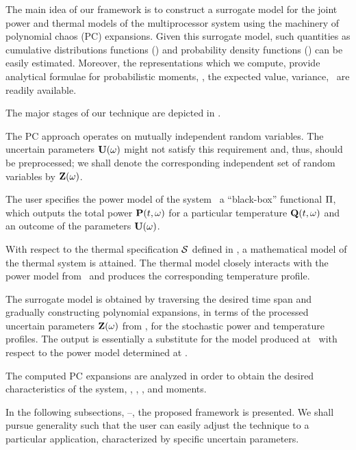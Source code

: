 The main idea of our framework is to construct a surrogate model for the joint power and thermal models of the multiprocessor system using the machinery of polynomial chaos (PC) expansions.
Given this surrogate model, such quantities as cumulative distributions functions (\cdfs) and probability density functions (\pdfs) can be easily estimated. Moreover, the representations which we compute, provide analytical formulae for probabilistic moments, \ie, the expected value, variance, \etc\ are readily available.

The major stages of our technique are depicted in .

The PC approach operates on mutually independent random variables. The uncertain parameters $\mathbf{U}(\omega)$ might not satisfy this requirement and, thus, should be preprocessed; we shall denote the corresponding independent set of random variables by $\mathbf{Z}(\omega)$.

The user specifies the power model of the system \via\ a ``black-box'' functional $\oPower$, which outputs the total power $\mathbf{P}(t, \omega)$ for a particular temperature $\mathbf{Q}(t, \omega)$ and an outcome of the parameters $\mathbf{U}(\omega)$.

With respect to the thermal specification $\mathcal{S}$ defined in , a mathematical model of the thermal system is attained.
The thermal model closely interacts with the power model from \ and produces the corresponding temperature profile.

The surrogate model is obtained by traversing the desired time span and gradually constructing polynomial expansions, in terms of the processed uncertain parameters $\mathbf{Z}(\omega)$ from , for the stochastic power and temperature profiles.
The output is essentially a substitute for the model produced at \ with respect to the power model determined at .

The computed PC expansions are analyzed in order to obtain the desired characteristics of the system, \eg, \cdfs, \pdfs, and moments.

In the following subsections, --, the proposed framework is presented.
We shall pursue generality such that the user can easily adjust the technique to a particular application, characterized by specific uncertain parameters.

